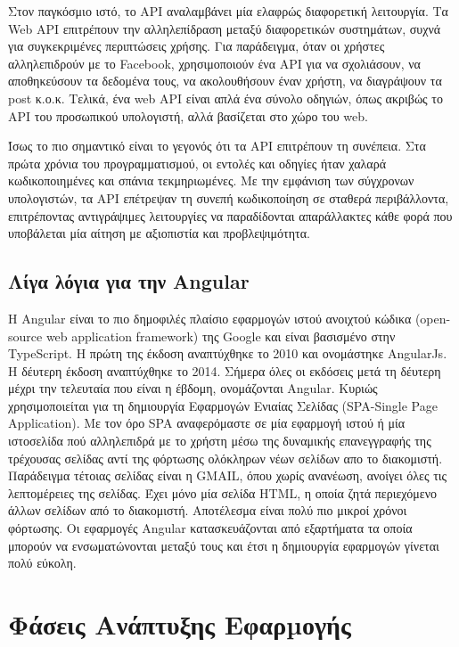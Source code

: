 \documentclass[a4paper,12pt]{article}
\begin{document}
			Στον παγκόσμιο ιστό, το API αναλαμβάνει μία ελαφρώς διαφορετική λειτουργία. Τα Web API επιτρέπουν την αλληλεπίδραση μεταξύ διαφορετικών συστημάτων, συχνά για συγκεκριμένες 
			περιπτώσεις χρήσης. Για παράδειγμα, όταν οι χρήστες αλληλεπιδρούν με το Facebook, χρησιμοποιούν ένα API για να σχολιάσουν, να αποθηκεύσουν τα δεδομένα τους, να ακολουθήσουν έναν 
			χρήστη, να διαγράψουν τα post κ.ο.κ. Τελικά, ένα web API είναι απλά ένα σύνολο οδηγιών, όπως ακριβώς το API του προσωπικού υπολογιστή, αλλά βασίζεται στο χώρο του web.
			
			Ίσως το πιο σημαντικό είναι το γεγονός ότι τα API επιτρέπουν τη συνέπεια. Στα πρώτα χρόνια του προγραμματισμού, οι εντολές και οδηγίες ήταν χαλαρά κωδικοποιημένες και σπάνια τεκμηριωμένες.   
			Με την εμφάνιση των σύγχρονων υπολογιστών, τα API επέτρεψαν τη συνεπή κωδικοποίηση σε σταθερά περιβάλλοντα, επιτρέποντας αντιγράψιμες λειτουργίες να παραδίδονται απαράλλακτες κάθε φορά που 
			υποβάλεται μία αίτηση με αξιοπιστία και προβλεψιμότητα.
		
		
			
		\newpage
		\subsection{Λίγα λόγια για την Angular}

			Η Angular είναι το πιο δημοφιλές πλαίσιο εφαρμογών ιστού ανοιχτού κώδικα (open-source web application framework) της Google και είναι βασισμένο στην TypeScript. Η πρώτη της έκδοση αναπτύχθηκε
			το 2010 και ονομάστηκε AngularJs. Η δέυτερη έκδοση αναπτύχθηκε το 2014. Σήμερα όλες οι εκδόσεις μετά τη δέυτερη μέχρι την τελευταία που είναι η έβδομη, ονομάζονται Angular. 
			Κυριώς χρησιμοποιείται για τη δημιουργία Εφαρμογών Ενιαίας Σελίδας (SPA-Single Page Application). Με τον όρο SPA αναφερόμαστε σε μία εφαρμογή ιστού ή μία ιστοσελίδα πού αλληλεπιδρά με το χρήστη μέσω της δυναμικής επανεγγραφής 
			της τρέχουσας σελίδας αντί της φόρτωσης ολόκληρων νέων σελίδων απο το διακομιστή. Παράδειγμα τέτοιας σελίδας είναι η GMAIL, όπου χωρίς ανανέωση, ανοίγει όλες τις λεπτομέρειες της σελίδας. 
			Έχει μόνο μία σελίδα HTML, η οποία ζητά περιεχόμενο άλλων σελίδων από το διακομιστή. Αποτέλεσμα είναι πολύ πιο μικροί χρόνοι φόρτωσης. Οι εφαρμογές Angular κατασκευάζονται από εξαρτήματα τα οποία
			μπορούν να ενσωματώνονται μεταξύ τους και έτσι η δημιουργία εφαρμογών γίνεται πολύ εύκολη.

		\newpage
		\section{Φάσεις Ανάπτυξης Εφαρµογής}
		
\end{document}

